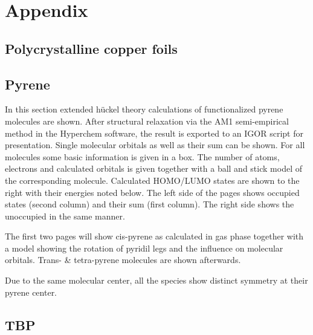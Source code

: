 \documentclass[
twoside,				%
BCOR=12mm,				%
headings=normal,		%
headsepline,			%
footsepline,			%
plainfootsepline,		%
]{scrbook}
\begin{document}
\backmatter{}

\chapter{Appendix}
%  
\section{Polycrystalline copper foils}
  
%  
\section{Pyrene}
In this section extended hückel theory calculations of functionalized pyrene molecules are shown. After structural relaxation via the AM1 semi-empirical method in the Hyperchem software, the result is exported to an IGOR script for presentation. Single molecular orbitals as well as their sum can be shown. For all molecules some basic information is given in a box. The number of atoms, electrons and calculated orbitals is given together with a ball and stick model of the corresponding molecule. Calculated HOMO/LUMO states are shown to the right with their energies noted below.
The left side of the pages shows occupied states (second column) and their sum (first column). The right side shows the unoccupied in the same manner.

The first two pages will show cis-pyrene as calculated in gas phase together with a model showing the rotation of pyridil legs and the influence on molecular orbitals. Trans- \& tetra-pyrene molecules are shown afterwards.

Due to the same molecular center, all the species show distinct symmetry at their pyrene center. 


%
%
  
  
  
  
\restoregeometry
 \section{TBP}
 
% 
\end{document}
